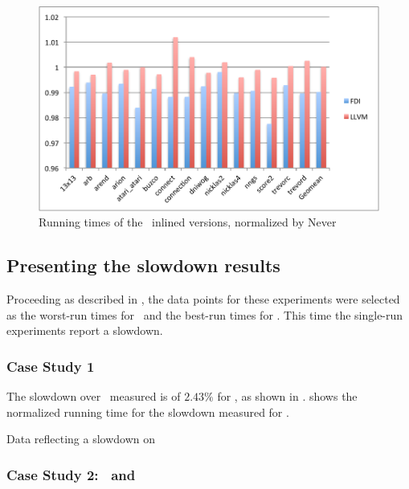 \begin{figure}
  \centering
  \includegraphics[width=1.00\linewidth]{Figures/speedupgbkall}
  \caption{Running times of the \gobmk\ inlined versions, normalized by Never}
  \label{fig:speedupgobmk}
\end{figure}


\subsection{Presenting the slowdown results}
\label{sec:slowdown}

Proceeding as described in , the data points for these experiments were selected as the worst-run times for \FDI\ and the best-run times for \llvm. This time the single-run experiments report a slowdown.

\subsubsection{Case Study 1 \gcc}

The slowdown over \llvm\ measured is of $2.43 \%$ for \gcc, as shown in .  shows the normalized running time for the slowdown measured for \gcc.

\begin{table}
  \centering
  \begin{tiny}
  
  \end{tiny}
  \caption{Data reflecting a slowdown on \gcc}
  \label{tab:slowdowngcc}
\end{table}


\subsubsection{Case Study 2: \bzip\  and \gzip}


